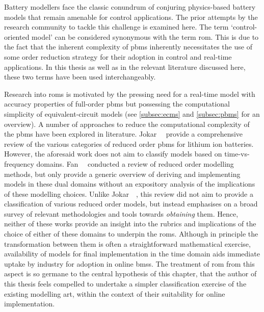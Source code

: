 

Battery modellers face the classic  conundrum of conjuring physics-based battery
models that remain amenable for control  applications. The prior attempts by the
research  community  to  tackle  this  challenge  is  examined  here.  The  term
`control-oriented model' can  be considered synonymous with  the term \gls{rom}.
This is due  to the fact that the inherent  complexity of \glspl{pbm} inherently
necessitates the  use of  some order  reduction strategy  for their  adoption in
control and  real-time applications. In this  thesis as well as  in the relevant
literature discussed here, these two terms have been used interchangeably.

Research into  \glspl{rom} is  motivated by  the pressing  need for  a real-time
model  with accuracy  properties of  full-order \glspl{pbm}  but possessing  the
computational  simplicity of  equivalent-circuit models  (see \cref{subsec:ecms}
and \cref{subsec:pbms}  for an overview). A  number of approaches to  reduce the
computational complexity  of the \glspl{pbm}  have been explored  in literature.
Jokar~\etal~\cite{Jokar2016}  provide  a  comprehensive review  of  the  various
categories of reduced order \glspl{pbm}  for lithium ion batteries. However, the
aforesaid  work does  not  aim  to classify  models  based on  time-vs-frequency
domains.  Fan~\etal{}~\cite{Fan2015}   conducted  a  review  of   reduced  order
modelling  methods,  but  only  provide  a  generic  overview  of  deriving  and
implementing models in these dual domains  without an expository analysis of the
implications  of these  modelling choices.  Unlike Jokar~\etal~\cite{Jokar2016},
this review  did not aim  to provide a  classification of various  reduced order
models, but instead  emphasises on a broad survey of  relevant methodologies and
tools  towards \emph{obtaining}  them.  Hence, neither  of  these works  provide
an  insight  into  the  rubrics  and   implications  of  the  choice  of  either
of  these  domains  to  underpin  the \glspl{rom}.  Although  in  principle  the
transformation between  them is  often a straightforward  mathematical exercise,
availability  of models for final  implementation in
the  time domain  aids  immediate  uptake by  industry  for  adoption in  online
\glspl{bms}. The  treatment of \gls{rom} from  this aspect is so  germane to the
central hypothesis of  this chapter, that  the author  of  this thesis  feels compelled  to undertake  a
simpler  classification  exercise of  the  existing  modelling art,  within  the
context of their suitability for online implementation.


